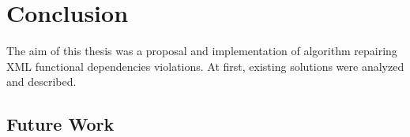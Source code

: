 \chapter{Conclusion}

The aim of this thesis was a proposal and implementation of algorithm repairing XML functional dependencies violations. At first, existing solutions were analyzed and described.

\section{Future Work}
